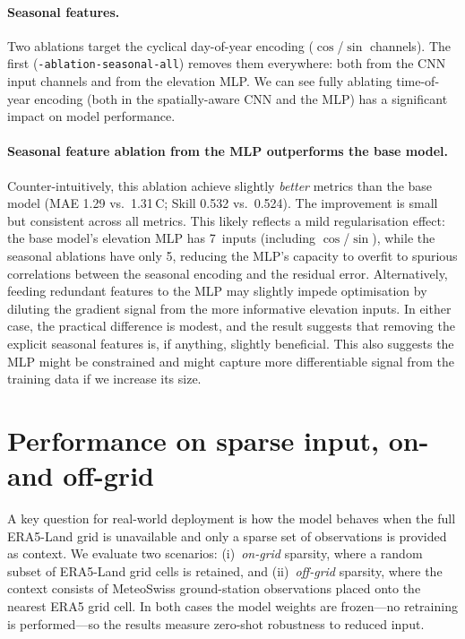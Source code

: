 \paragraph{Seasonal features.}
Two ablations target the cyclical day-of-year encoding ($\cos$/$\sin$ channels). The first (\texttt{-ablation-seasonal-all}) removes them everywhere: both from the CNN input channels and from the elevation MLP. We can see fully ablating time-of-year encoding (both in the spatially-aware CNN and the MLP) has a significant impact on model performance.

\paragraph{Seasonal feature ablation from the MLP outperforms the base model.}
Counter-intuitively, this ablation achieve slightly \emph{better} metrics than the base model (MAE 1.29 vs.\ 1.31\,\textdegree C; Skill 0.532 vs.\ 0.524). The improvement is small but consistent across all metrics. This likely reflects a mild regularisation effect: the base model's elevation MLP has 7~inputs (including $\cos$/$\sin$), while the seasonal ablations have only 5, reducing the MLP's capacity to overfit to spurious correlations between the seasonal encoding and the residual error. Alternatively, feeding redundant features to the MLP may slightly impede optimisation by diluting the gradient signal from the more informative elevation inputs. In either case, the practical difference is modest, and the result suggests that removing the explicit seasonal features is, if anything, slightly beneficial. This also suggests the MLP might be constrained and might capture more differentiable signal from the training data if we increase its size.

\section{Performance on sparse input, on- and off-grid}
\label{sec:sparse}

A key question for real-world deployment is how the model behaves when the full ERA5-Land grid is unavailable and only a sparse set of observations is provided as context. We evaluate two scenarios: (i)~\emph{on-grid} sparsity, where a random subset of ERA5-Land grid cells is retained, and (ii)~\emph{off-grid} sparsity, where the context consists of MeteoSwiss ground-station observations placed onto the nearest ERA5 grid cell. In both cases the model weights are frozen---no retraining is performed---so the results measure zero-shot robustness to reduced input.

